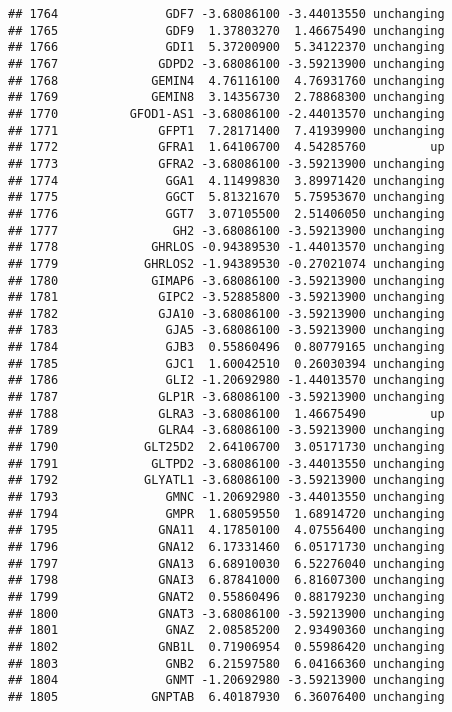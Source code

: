 \documentclass[]{article}
\begin{document}
\begin{verbatim}
## 1764               GDF7 -3.68086100 -3.44013550 unchanging
## 1765               GDF9  1.37803270  1.46675490 unchanging
## 1766               GDI1  5.37200900  5.34122370 unchanging
## 1767              GDPD2 -3.68086100 -3.59213900 unchanging
## 1768             GEMIN4  4.76116100  4.76931760 unchanging
## 1769             GEMIN8  3.14356730  2.78868300 unchanging
## 1770          GFOD1-AS1 -3.68086100 -2.44013570 unchanging
## 1771              GFPT1  7.28171400  7.41939900 unchanging
## 1772              GFRA1  1.64106700  4.54285760         up
## 1773              GFRA2 -3.68086100 -3.59213900 unchanging
## 1774               GGA1  4.11499830  3.89971420 unchanging
## 1775               GGCT  5.81321670  5.75953670 unchanging
## 1776               GGT7  3.07105500  2.51406050 unchanging
## 1777                GH2 -3.68086100 -3.59213900 unchanging
## 1778             GHRLOS -0.94389530 -1.44013570 unchanging
## 1779            GHRLOS2 -1.94389530 -0.27021074 unchanging
## 1780             GIMAP6 -3.68086100 -3.59213900 unchanging
## 1781              GIPC2 -3.52885800 -3.59213900 unchanging
## 1782              GJA10 -3.68086100 -3.59213900 unchanging
## 1783               GJA5 -3.68086100 -3.59213900 unchanging
## 1784               GJB3  0.55860496  0.80779165 unchanging
## 1785               GJC1  1.60042510  0.26030394 unchanging
## 1786               GLI2 -1.20692980 -1.44013570 unchanging
## 1787              GLP1R -3.68086100 -3.59213900 unchanging
## 1788              GLRA3 -3.68086100  1.46675490         up
## 1789              GLRA4 -3.68086100 -3.59213900 unchanging
## 1790            GLT25D2  2.64106700  3.05171730 unchanging
## 1791             GLTPD2 -3.68086100 -3.44013550 unchanging
## 1792            GLYATL1 -3.68086100 -3.59213900 unchanging
## 1793               GMNC -1.20692980 -3.44013550 unchanging
## 1794               GMPR  1.68059550  1.68914720 unchanging
## 1795              GNA11  4.17850100  4.07556400 unchanging
## 1796              GNA12  6.17331460  6.05171730 unchanging
## 1797              GNA13  6.68910030  6.52276040 unchanging
## 1798              GNAI3  6.87841000  6.81607300 unchanging
## 1799              GNAT2  0.55860496  0.88179230 unchanging
## 1800              GNAT3 -3.68086100 -3.59213900 unchanging
## 1801               GNAZ  2.08585200  2.93490360 unchanging
## 1802              GNB1L  0.71906954  0.55986420 unchanging
## 1803               GNB2  6.21597580  6.04166360 unchanging
## 1804               GNMT -1.20692980 -3.59213900 unchanging
## 1805             GNPTAB  6.40187930  6.36076400 unchanging

\end{verbatim}
\end{document}
